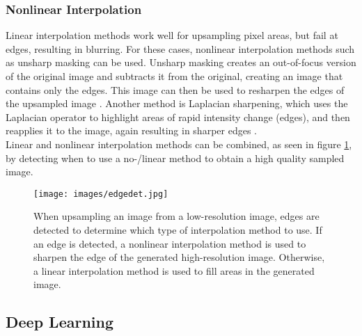 \documentclass[letterpaper, 10 pt, conference]{ieeeconf}  %
\begin{document}
\subsubsection{Nonlinear Interpolation}

Linear interpolation methods work well for upsampling pixel areas, but fail at edges, resulting in blurring.
For these cases, nonlinear interpolation methods such as unsharp masking can be used. Unsharp masking creates an out-of-focus version of the original image and subtracts it from the original, creating an image that contains only the edges.
This image can then be used to resharpen the edges of the upsampled image \cite{deng2010generalized}.
Another method is Laplacian sharpening, which uses the Laplacian operator to highlight areas of rapid intensity change (edges), and then reapplies it to the image, again resulting in sharper edges \cite{wang2022interpolation}.\\
Linear and nonlinear interpolation methods can be combined, as seen in figure \ref{fig:edge_det}, by detecting when to use a no-/linear method to obtain a high quality sampled image.

\begin{figure}[!ht]
        \caption{When upsampling an image from a low-resolution image, edges are detected to determine which type of interpolation method to use.
                If an edge is detected, a nonlinear interpolation method is used to sharpen the edge of the generated high-resolution image. 
                Otherwise, a linear interpolation method is used to fill areas in the generated image.}
        \centering
        \texttt{[image: images/edgedet.jpg]}
        \label{fig:edge_det}
    \end{figure}

\subsection{Deep Learning}
\end{document}
